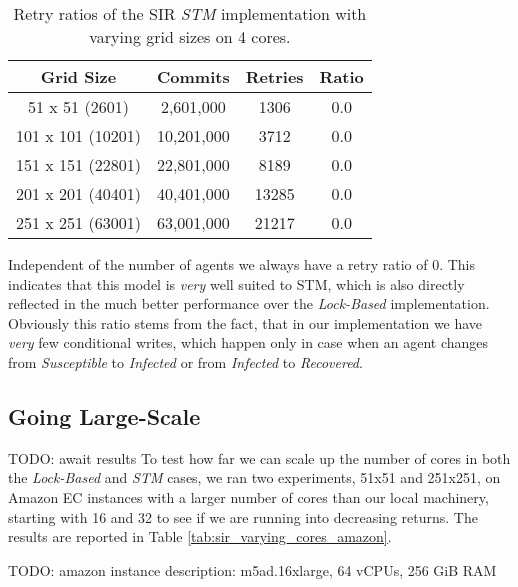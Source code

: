 \begin{table}
	\centering
  	\begin{tabular}{ c || c | c | c }
        Grid Size 		   & Commits     & Retries  & Ratio  \\ \hline \hline 
   		51 x 51 (2601)     & 2,601,000   & 1306     & 0.0    \\ \hline
   		101 x 101 (10201)  & 10,201,000  & 3712     & 0.0    \\ \hline
   		151 x 151 (22801)  & 22,801,000  & 8189     & 0.0    \\ \hline
   		201 x 201 (40401)  & 40,401,000  & 13285    & 0.0    \\ \hline
   		251 x 251 (63001)  & 63,001,000  & 21217    & 0.0    \\ \hline \hline
  	\end{tabular}
  	
  	\caption{Retry ratios of the SIR \textit{STM} implementation with varying grid sizes on 4 cores.}
	\label{tab:retries_stm}
\end{table}

Independent of the number of agents we always have a retry ratio of 0. This indicates that this model is \textit{very} well suited to STM, which is also directly reflected in the much better performance over the \textit{Lock-Based} implementation. Obviously this ratio stems from the fact, that in our implementation we have \textit{very} few conditional writes, which happen only in case when an agent changes from \textit{Susceptible} to \textit{Infected} or from \textit{Infected} to \textit{Recovered}. 

\subsection{Going Large-Scale}
TODO: await results
To test how far we can scale up the number of cores in both the \textit{Lock-Based} and \textit{STM} cases, we ran two experiments, 51x51 and 251x251, on Amazon EC instances with a larger number of cores than our local machinery, starting with 16 and 32 to see if we are running into decreasing returns. The results are reported in Table \ref{tab:sir_varying_cores_amazon}.

TODO: amazon instance description: m5ad.16xlarge, 64 vCPUs, 256 GiB RAM

